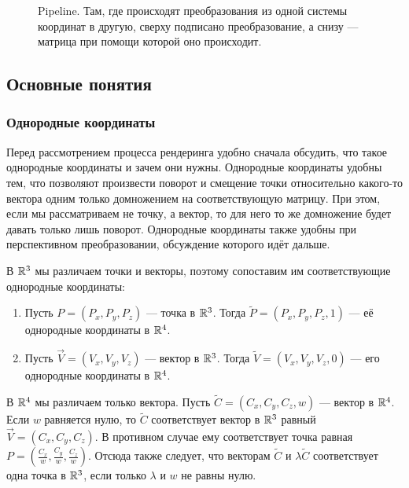 \documentclass{article}
\begin{document}
\begin{figure}[ht]
    \caption{Pipeline. Там, где происходят преобразования из одной системы координат в другую, сверху подписано преобразование, а снизу --- матрица при помощи которой оно происходит.}
    \label{pipeline}
\end{figure}

\subsection{Основные понятия}

\subsubsection{Однородные координаты}

Перед рассмотрением процесса рендеринга удобно сначала обсудить, что такое однородные координаты и зачем они нужны.
Однородные координаты удобны тем, что позволяют произвести поворот и смещение точки относительно какого-то вектора одним только домножением на соответствующую матрицу.
При этом, если мы рассматриваем не точку, а вектор, то для него то же домножение будет давать только лишь поворот.
Однородные координаты также удобны при перспективном преобразовании, обсуждение которого идёт дальше.

В $\mathbb{R}^{3}$ мы различаем точки и векторы, поэтому сопоставим им соответствующие однородные координаты:
\begin{enumerate}
	\item
	Пусть $P = (P_{x}, P_{y}, P_{z})$ --- точка в $\mathbb{R}^{3}$.
	Тогда $\widetilde{P} = (P_{x}, P_{y}, P_{z}, 1)$ --- её однородные координаты в $\mathbb{R}^{4}$.
	\item
	Пусть $\vec{V} = (V_{x}, V_{y}, V_{z})$ --- вектор в $\mathbb{R}^{3}$.
	Тогда $\widetilde{V} = (V_{x}, V_{y},V_{z} , 0)$ --- его однородные координаты в $\mathbb{R}^{4}$.
\end{enumerate}

В $\mathbb{R}^{4}$ мы различаем только вектора.
Пусть $\widetilde{C} = (C_{x}, C_{y}, C_{z}, w)$ --- вектор в $\mathbb{R}^{4}$.
Если $w$ равняется нулю, то $\widetilde{C}$ соответствует вектор в $\mathbb{R}^{3}$ равный $\vec{V} = (C_{x}, C_{y}, C_{z})$.
В противном случае ему соответствует точка равная $P = (\frac{C_{x}}{w}, \frac{C_{y}}{w}, \frac{C_{z}}{w})$.
Отсюда также следует, что векторам $\widetilde{C}$ и $\lambda \widetilde{C}$ соответствует одна точка в $\mathbb{R}^{3}$, если только $\lambda$ и $w$ не равны нулю.
\end{document}
